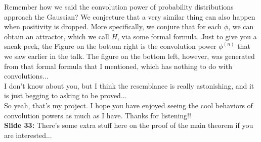 \documentclass[11pt]{article}
\begin{document}
Remember how we said the convolution power of probability distributions approach the Gaussian? We conjecture that a very similar thing can also happen when positivity is dropped. More specifically, we conjure that for each $\phi$, we can obtain an attractor, which we call $H$, via some formal formula. Just to give you a sneak peek, the Figure on the bottom right is the convolution power $\phi^{(n)}$ that we saw earlier in the talk. The figure on the bottom left, however, was generated from that formal formula that I mentioned, which has nothing to do with convolutions...\\
 

I don't know about you, but I think the resemblance is really astonishing, and it is just begging to asking to be proved...\\


So yeah, that's my project. I hope you have enjoyed seeing the cool behaviors of convolution powers as much as I have. Thanks for listening!!\\

\noindent \textbf{Slide 33:} There's some extra stuff here on the proof of the main theorem if you are interested...\\






	
	
\end{document}
